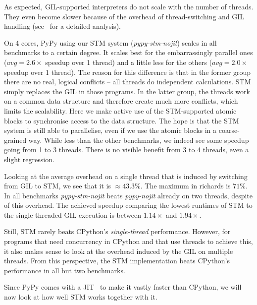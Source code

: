 \documentclass{sigplanconf}
\begin{document}
As expected, GIL-supported interpreters do not scale with the number
of threads. They even become slower because of the overhead of
thread-switching and GIL handling (see~\cite{beazley10} for a detailed
analysis).

On 4 cores, PyPy using our STM system (\emph{pypy-stm-nojit}) scales
in all benchmarks to a certain degree. It scales best for the
embarrassingly parallel ones ($avg=2.6\times$ speedup over 1 thread)
and a little less for the others ($avg=2.0\times$ speedup over 1
thread). The reason for this difference is
that in the former group there are no real, logical conflicts -- all
threads do independent calculations. STM simply replaces the GIL in
those programs. In the latter group, the threads work on a common data
structure and therefore create much more conflicts, which limits the
scalability. Here we make active use of the STM-supported atomic
blocks to synchronise access to the data structure. The hope
is that the STM system is still able to parallelise, even if we use
the atomic blocks in a coarse-grained way. While less than the other
benchmarks, we indeed see some speedup going from 1 to 3 threads.
There is no visible benefit from 3 to 4 threads, even a slight
regression.

Looking at the average overhead on a single thread that is induced by
switching from GIL to STM, we see that it is $\approx 43.3\%$. The
maximum in richards is $71\%$. In all benchmarks \emph{pypy-stm-nojit}
beats \emph{pypy-nojit} already on two threads, despite of this
overhead.  The achieved speedup comparing the lowest runtimes of STM
to the single-threaded GIL execution is between $1.14\times$ and
$1.94\times$.

Still, STM rarely beats CPython's \emph{single-thread} performance. However, for
programs that need concurrency in CPython and that use threads to
achieve this, it also makes sense to look at the overhead induced by
the GIL on multiple threads. From this perspective, the STM
implementation beats CPython's performance in all but two benchmarks.

Since PyPy comes with a JIT~\cite{cfbolz09} to make it vastly faster
than CPython, we will now look at how well STM works together with it.
\end{document}
